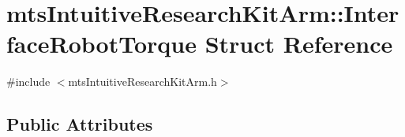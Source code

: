 \hypertarget{structmts_intuitive_research_kit_arm_1_1_interface_robot_torque}{}\section{mts\+Intuitive\+Research\+Kit\+Arm\+:\+:Interface\+Robot\+Torque Struct Reference}
\label{structmts_intuitive_research_kit_arm_1_1_interface_robot_torque}


{\ttfamily \#include $<$mts\+Intuitive\+Research\+Kit\+Arm.\+h$>$}

\subsection*{Public Attributes}

